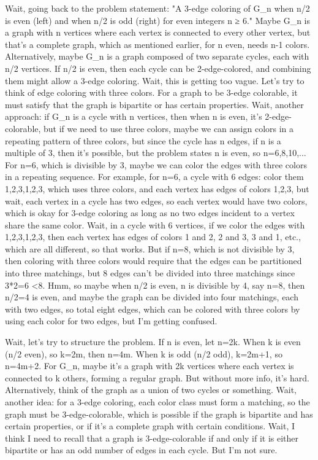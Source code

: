 Wait, going back to the problem statement: "A 3-edge coloring of G_n when n/2 is even (left) and when n/2 is odd (right) for even integers n ≥ 6." Maybe G_n is a graph with n vertices where each vertex is connected to every other vertex, but that's a complete graph, which as mentioned earlier, for n even, needs n-1 colors. Alternatively, maybe G_n is a graph composed of two separate cycles, each with n/2 vertices. If n/2 is even, then each cycle can be 2-edge-colored, and combining them might allow a 3-edge coloring. Wait, this is getting too vague. Let's try to think of edge coloring with three colors. For a graph to be 3-edge colorable, it must satisfy that the graph is bipartite or has certain properties. Wait, another approach: if G_n is a cycle with n vertices, then when n is even, it's 2-edge-colorable, but if we need to use three colors, maybe we can assign colors in a repeating pattern of three colors, but since the cycle has n edges, if n is a multiple of 3, then it's possible, but the problem states n is even, so n=6,8,10,... For n=6, which is divisible by 3, maybe we can color the edges with three colors in a repeating sequence. For example, for n=6, a cycle with 6 edges: color them 1,2,3,1,2,3, which uses three colors, and each vertex has edges of colors 1,2,3, but wait, each vertex in a cycle has two edges, so each vertex would have two colors, which is okay for 3-edge coloring as long as no two edges incident to a vertex share the same color. Wait, in a cycle with 6 vertices, if we color the edges with 1,2,3,1,2,3, then each vertex has edges of colors 1 and 2, 2 and 3, 3 and 1, etc., which are all different, so that works. But if n=8, which is not divisible by 3, then coloring with three colors would require that the edges can be partitioned into three matchings, but 8 edges can't be divided into three matchings since 3*2=6 <8. Hmm, so maybe when n/2 is even, n is divisible by 4, say n=8, then n/2=4 is even, and maybe the graph can be divided into four matchings, each with two edges, so total eight edges, which can be colored with three colors by using each color for two edges, but I'm getting confused.

Wait, let's try to structure the problem. If n is even, let n=2k. When k is even (n/2 even), so k=2m, then n=4m. When k is odd (n/2 odd), k=2m+1, so n=4m+2. For G_n, maybe it's a graph with 2k vertices where each vertex is connected to k others, forming a regular graph. But without more info, it's hard. Alternatively, think of the graph as a union of two cycles or something. Wait, another idea: for a 3-edge coloring, each color class must form a matching, so the graph must be 3-edge-colorable, which is possible if the graph is bipartite and has certain properties, or if it's a complete graph with certain conditions. Wait, I think I need to recall that a graph is 3-edge-colorable if and only if it is either bipartite or has an odd number of edges in each cycle. But I'm not sure.

